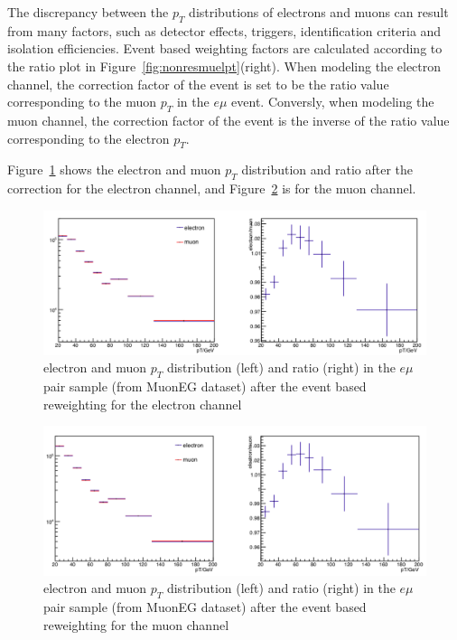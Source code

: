 \vspace{0.3cm}
The discrepancy between the $p_T$ distributions of electrons and muons can result from many factors, such as detector effects, triggers, identification criteria and isolation efficiencies. Event based weighting factors are calculated according to the ratio plot in Figure~\ref{fig:nonresmuelpt}(right). When modeling the electron channel, the correction factor of the event is set to be the ratio value corresponding to the muon $p_T$ in the $e\mu$ event. Conversly, when modeling the muon channel, the correction factor of the event is the inverse of the ratio value corresponding to the electron $p_T$.

\vspace{0.3cm}
Figure~\ref{fig:nonresmuelptel} shows the electron and muon $p_T$ distribution and ratio after the correction for the electron channel, and Figure~\ref{fig:nonresmuelptmu} is for the muon channel.

\begin{figure}[htbp]
\begin{center}
\includegraphics[width=0.95\linewidth]{figures/nonresmuelptel.png}
\caption{electron and muon $p_T$ distribution (left) and ratio (right) in the $e\mu$ pair sample (from MuonEG dataset) after the event based reweighting for the electron channel}
\label{fig:nonresmuelptel}
\end{center}
\end{figure}

\begin{figure}[htbp]
\begin{center}
\includegraphics[width=0.95\linewidth]{figures/nonresmuelptmu.png}
\caption{electron and muon $p_T$ distribution (left) and ratio (right) in the $e\mu$ pair sample (from MuonEG dataset) after the event based reweighting for the muon channel}
\label{fig:nonresmuelptmu}
\end{center}
\end{figure}

